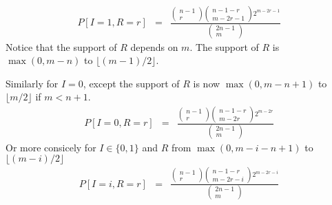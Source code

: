 \documentclass{article}
\begin{document}
\begin{eqnarray}
P[I=1,R=r] &=& \frac{\left(\begin{matrix}n-1\\r \end{matrix}\right) \left(\begin{matrix}n-1-r\\m-2r-1 \end{matrix}\right)2^{m-2r-1}}
{\left(\begin{matrix}2n-1\\m \end{matrix}\right)}
\end{eqnarray}
Notice that the support of $R$ depends on $m$. The support of $R$ is $\max(0, m-n)$ to $\lfloor (m-1)/2\rfloor$.

Similarly for $I=0$, except the support of $R$ is now $\max(0, m-n+1)$ to $\lfloor m/2\rfloor$ if $m<n+1$.
\begin{eqnarray}
P[I=0,R=r] &=& \frac{\left(\begin{matrix}n-1\\r \end{matrix}\right) \left(\begin{matrix}n-1-r\\m-2r \end{matrix}\right)2^{m-2r}}
{\left(\begin{matrix}2n-1\\m \end{matrix}\right)}
\end{eqnarray}
Or more consicely for $I\in\{0,1\}$ and $R$ from $\max(0,m-i-n+1)$ to $\lfloor (m-i)/2\rfloor$
\begin{eqnarray}
P[I=i,R=r] &=& \frac{\left(\begin{matrix}n-1\\r \end{matrix}\right) \left(\begin{matrix}n-1-r\\m-2r-i \end{matrix}\right)2^{m-2r-i}}
{\left(\begin{matrix}2n-1\\m \end{matrix}\right)}
\end{eqnarray}
\end{document}

